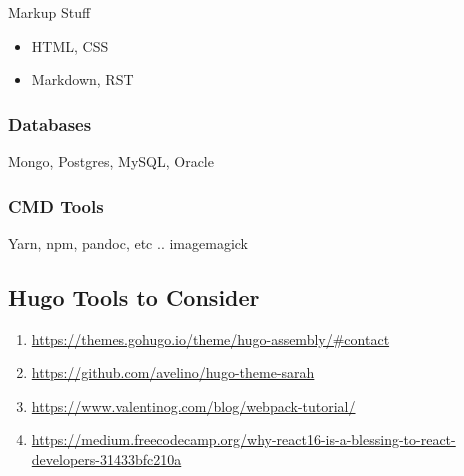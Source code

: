 Markup Stuff

\begin{itemize}
\tightlist
\item
  HTML, CSS
\item
  Markdown, RST
\end{itemize}


\subsubsection{Databases}\label{databases}

Mongo, Postgres, MySQL, Oracle


\subsubsection{CMD Tools}\label{cmd-tools}

Yarn, npm, pandoc, etc .. imagemagick

\hypertarget{hugo-tools-to-consider}{%
\subsection{Hugo Tools to Consider}\label{hugo-tools-to-consider}}

\begin{enumerate}
\def\labelenumi{\arabic{enumi}.}
\tightlist
\item
  \url{https://themes.gohugo.io/theme/hugo-assembly/\#contact}
\item
  \url{https://github.com/avelino/hugo-theme-sarah}
\item
  \url{https://www.valentinog.com/blog/webpack-tutorial/}
\item
  \url{https://medium.freecodecamp.org/why-react16-is-a-blessing-to-react-developers-31433bfc210a}
\end{enumerate}